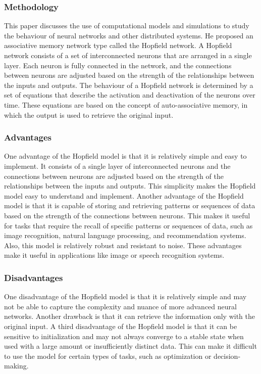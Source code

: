 \subsubsection{Methodology}
This paper discusses the use of computational models and simulations to study
the behaviour of neural networks and other distributed systems. He proposed an
associative memory network type called the Hopfield network. A Hopfield network
consists of a set of interconnected neurons that are arranged in a single
layer. Each neuron is fully connected in the network, and the connections
between neurons are adjusted based on the strength of the relationships between
the inputs and outputs. The behaviour of a Hopfield network is determined by a
set of equations that describe the activation and deactivation of the neurons
over time. These equations are based on the concept of auto-associative memory,
in which the output is used to retrieve the original input.
\subsubsection{Advantages}
One advantage of the Hopfield model is that it is relatively simple and easy to
implement. It consists of a single layer of interconnected neurons and the
connections between neurons are adjusted based on the strength of the
relationships between the inputs and outputs. This simplicity makes the
Hopfield model easy to understand and implement. Another advantage of the
Hopfield model is that it is capable of storing and retrieving patterns or
sequences of data based on the strength of the connections between neurons.
This makes it useful for tasks that require the recall of specific patterns or
sequences of data, such as image recognition, natural language processing, and
recommendation systems. Also, this model is relatively robust and resistant to
noise. These advantages make it useful in applications like image or speech
recognition systems.
\subsubsection{Disadvantages}
One disadvantage of the Hopfield model is that it is relatively simple and may
not be able to capture the complexity and nuance of more advanced neural
networks. Another drawback is that it can retrieve the information only with
the original input. A third disadvantage of the Hopfield model is that it can
be sensitive to initialization and may not always converge to a stable state
when used with a large amount or insufficiently distinct data. This can make it
difficult to use the model for certain types of tasks, such as optimization or
decision-making.
